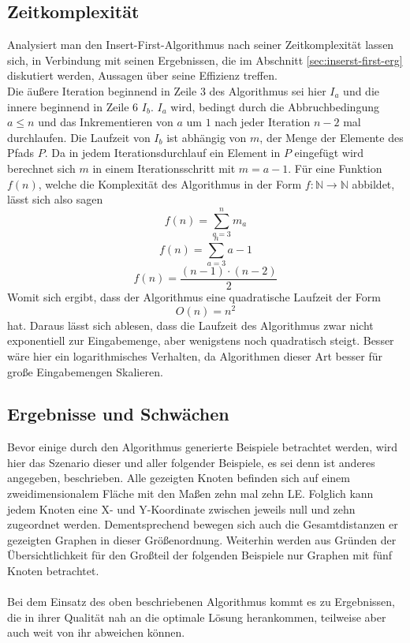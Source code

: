 \subsection{Zeitkomplexität}\label{sec:time-comp-first}
Analysiert man den Insert-First-Algorithmus nach seiner Zeitkomplexität lassen sich, in Verbindung mit seinen Ergebnissen, die im Abschnitt \vref{sec:inserst-first-erg} diskutiert werden, Aussagen über seine Effizienz treffen.
\\
Die äußere Iteration beginnend in Zeile 3 des Algorithmus sei hier $I_a$ und die innere beginnend in Zeile 6 $I_b$.
$I_a$ wird, bedingt durch die Abbruchbedingung $a\leq n$ und das Inkrementieren von $a$ um $1$ nach jeder Iteration $n-2$ mal durchlaufen.
Die Laufzeit von $I_b$ ist abhängig von $m$, der Menge der Elemente des Pfads $P$.
Da in jedem Iterationsdurchlauf ein Element in $P$ eingefügt wird berechnet sich $m$ in einem Iterationsschritt mit $m=a-1$.
Für eine Funktion $f(n)$, welche die Komplexität des Algorithmus in der Form $f: \mathbb{N} \rightarrow \mathbb{N}$ abbildet, lässt sich also sagen
$$f(n) = \sum_{a = 3}^n m_a$$
$$f(n) = \sum_{a=3}^n a - 1$$
$$f(n) = \frac{(n-1)\cdot (n-2)}{2}$$
Womit sich ergibt, dass der Algorithmus eine quadratische Laufzeit der Form
$$O(n)= n^2$$
hat.
Daraus lässt sich ablesen, dass die Laufzeit des Algorithmus zwar nicht exponentiell zur Eingabemenge, aber wenigstens noch quadratisch steigt.
Besser wäre hier ein logarithmisches Verhalten, da Algorithmen dieser Art besser für große Eingabemengen Skalieren.\autocite[S. 9ff.]{Gurski.2010}


\subsection{Ergebnisse und Schwächen} \label{sec:inserst-first-erg}
Bevor einige durch den Algorithmus generierte Beispiele betrachtet werden, wird hier das Szenario dieser und aller folgender Beispiele, es sei denn ist anderes angegeben, beschrieben.
Alle gezeigten Knoten befinden sich auf einem zweidimensionalem Fläche mit den Maßen zehn mal zehn \ac{LE}.
Folglich kann jedem Knoten eine X- und Y-Koordinate zwischen jeweils null und zehn zugeordnet werden. 
Dementsprechend bewegen sich auch die Gesamtdistanzen er gezeigten Graphen in dieser Größenordnung.
Weiterhin werden aus Gründen der Übersichtlichkeit für den Großteil der folgenden Beispiele nur Graphen mit fünf Knoten betrachtet.
\\\\
Bei dem Einsatz des oben beschriebenen Algorithmus kommt es zu Ergebnissen, die in ihrer Qualität nah an die optimale Lösung herankommen, teilweise aber auch weit von ihr abweichen können.  

